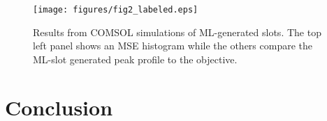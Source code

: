 \documentclass[11pt]{article}
\begin{document}
\begin{figure}[H]
	\centering
	\texttt{[image: figures/fig2\_labeled.eps]}
	\caption{Results from COMSOL simulations of ML-generated slots. The top left panel shows an MSE histogram while the others compare the ML-slot generated peak profile to the objective.}
\end{figure}




\section*{Conclusion}



\end{document}
